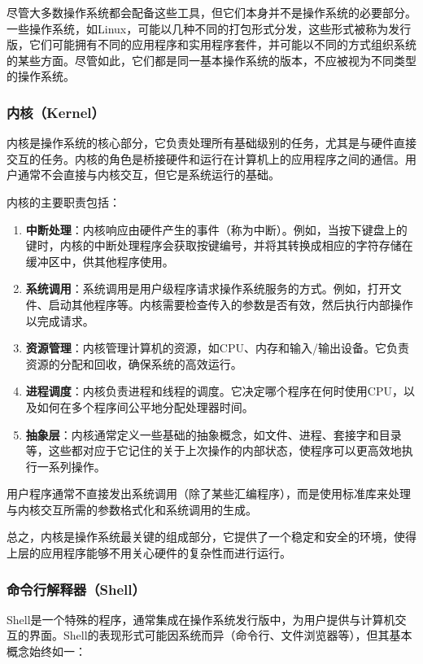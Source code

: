 尽管大多数操作系统都会配备这些工具，但它们本身并不是操作系统的必要部分。一些操作系统，如Linux，可能以几种不同的打包形式分发，这些形式被称为发行版，它们可能拥有不同的应用程序和实用程序套件，并可能以不同的方式组织系统的某些方面。尽管如此，它们都是同一基本操作系统的版本，不应被视为不同类型的操作系统。

\subsubsection{内核（Kernel）}

内核是操作系统的核心部分，它负责处理所有基础级别的任务，尤其是与硬件直接交互的任务。内核的角色是桥接硬件和运行在计算机上的应用程序之间的通信。用户通常不会直接与内核交互，但它是系统运行的基础。

内核的主要职责包括：

\begin{enumerate}
    \item \textbf{中断处理}：内核响应由硬件产生的事件（称为中断）。例如，当按下键盘上的键时，内核的中断处理程序会获取按键编号，并将其转换成相应的字符存储在缓冲区中，供其他程序使用。
    \item \textbf{系统调用}：系统调用是用户级程序请求操作系统服务的方式。例如，打开文件、启动其他程序等。内核需要检查传入的参数是否有效，然后执行内部操作以完成请求。
    \item \textbf{资源管理}：内核管理计算机的资源，如CPU、内存和输入/输出设备。它负责资源的分配和回收，确保系统的高效运行。
    \item \textbf{进程调度}：内核负责进程和线程的调度。它决定哪个程序在何时使用CPU，以及如何在多个程序间公平地分配处理器时间。
    \item \textbf{抽象层}：内核通常定义一些基础的抽象概念，如文件、进程、套接字和目录等，这些都对应于它记住的关于上次操作的内部状态，使程序可以更高效地执行一系列操作。
\end{enumerate}

用户程序通常不直接发出系统调用（除了某些汇编程序），而是使用标准库来处理与内核交互所需的参数格式化和系统调用的生成。

总之，内核是操作系统最关键的组成部分，它提供了一个稳定和安全的环境，使得上层的应用程序能够不用关心硬件的复杂性而进行运行。

\subsubsection{命令行解释器（Shell）}

Shell是一个特殊的程序，通常集成在操作系统发行版中，为用户提供与计算机交互的界面。Shell的表现形式可能因系统而异（命令行、文件浏览器等），但其基本概念始终如一：

